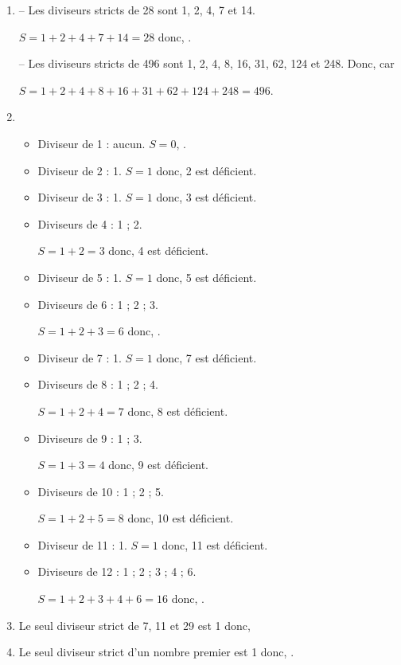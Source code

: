 \begin{Maquette}[Fiche,CorrigeFin,Colonnes=2]{}
\begin{multicols}{2}
      \begin{Solution}
         \begin{enumerate}
            \item -- Les diviseurs stricts de 28 sont 1, 2, 4, 7 et 14. \par
               $S =1+2+4+7+14 =28$ donc, . \par
               -- Les diviseurs stricts de 496 sont 1, 2, 4, 8, 16, 31, 62, 124 et 248. Donc,  car \par
               $S =1+2+4+8+16+31+62+124+248 =496$.
            \item 
               \begin{itemize}
                  \item Diviseur de 1 : aucun. $S =0$, .
                  \item Diviseur de 2 : 1. $S =1$ donc, 2 est déficient.
                  \item Diviseur de 3 : 1. $S =1$ donc, 3 est déficient.
                  \item Diviseurs de 4 : 1 ; 2. \par
                     $S =1+2 =3$ donc, 4 est déficient.
                  \item Diviseur de 5 : 1. $S =1$ donc, 5 est déficient.
                  \item Diviseurs de 6 : 1 ; 2 ; 3. \par
                     $S =1+2+3 =6$ donc, .
                  \item Diviseur de 7 : 1. $S =1$ donc, 7 est déficient.
                  \item Diviseurs de 8 : 1 ; 2 ; 4. \par
                     $S =1+2+4 =7$ donc, 8 est déficient.
                  \item Diviseurs de 9 : 1 ; 3. \par
                     $S =1+3 =4$ donc, 9 est déficient.
                  \item Diviseurs de 10 : 1 ; 2 ; 5. \par
                     $S =1+2+5 =8$ donc, 10 est déficient.
                  \item Diviseur de 11 : 1. $S =1$ donc, 11 est déficient.
                  \item Diviseurs de 12 : 1 ; 2 ; 3 ; 4 ; 6. \par
                     $S =1+2+3+4+6 =16$ donc, .
               \end{itemize}
            \item Le seul diviseur strict de 7, 11 et 29 est 1 donc, 
            \item Le seul diviseur strict d'un nombre premier est 1 donc, .
         \end{enumerate}
      \end{Solution}



\end{multicols}
\end{Maquette}

